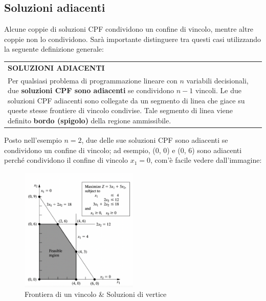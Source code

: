 \documentclass[a4paper]{extarticle}
\renewcommand\arraystretch{}
\begin{document}
\subsection{Soluzioni adiacenti}
Alcune coppie di soluzioni CPF  condividono un confine di vincolo, mentre altre coppie non lo condividono. Sarà importante distinguere tra questi casi utilizzando la seguente definizione generale:

\vspace{1em}
\setlength{\tabcolsep}{14pt}
\renewcommand{\arraystretch}{2}
\noindent
\begin{tabularx}{\textwidth}{@{}|P|@{}}
    \hline
    {\textbf{SOLUZIONI ADIACENTI}}\\
    \parbox{\linewidth}{Per qualsiasi problema di programmazione lineare con $n$ variabili decisionali, due \textbf{soluzioni CPF sono adiacenti} se condividono $n - 1$ vincoli.\\
    Le due soluzioni CPF adiacenti sono collegate da un segmento di linea che giace su queste stesse frontiere di vincolo condivise. Tale segmento di linea viene definito \textbf{bordo (spigolo)} della regione ammissibile. \vspace{3mm}}\\
    \hline
\end{tabularx}

\vspace{1em}
\noindent
Posto nell'esempio $n = 2$, due delle sue soluzioni CPF sono adiacenti se condividono un confine di vincolo; ad esempio, (0, 0) e (0, 6) sono adiacenti perché condividono il confine di vincolo $x_1 = 0$, com'è facile vedere dall'immagine:

\begin{figure}[H]
    \centering
    \includegraphics[width=0.5\textwidth]{Frontiera_vincolo_soluzioni_vertice}
    \caption{Frontiera di un vincolo \& Soluzioni di vertice}
    \label{fig:fig1_1}
\end{figure}
\end{document}
